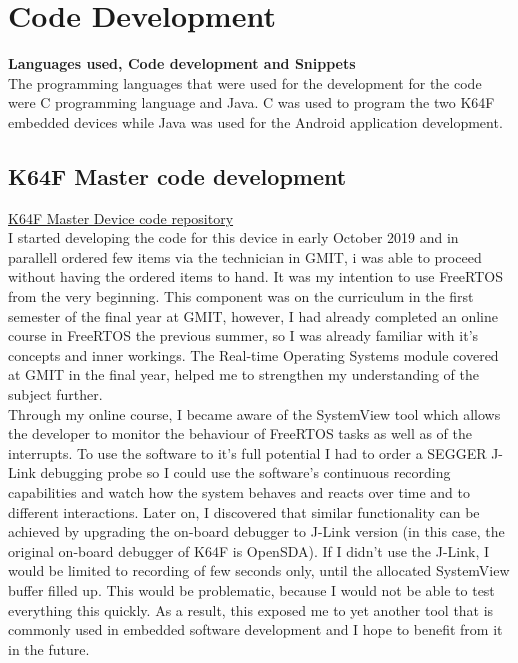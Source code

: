 \documentclass[12pt,a4paper]{article}
\begin{document}
            \newpage
		
		\section{Code Development}
		{\bfseries Languages used, Code development and Snippets}\\
		
		The programming languages that were used for the development for the code were C programming language and Java. C was used to program the two K64F embedded devices while Java was used for the Android application development.
		
		\subsection{K64F Master code development}
		\href{https://github.com/zedd-1983/project_journal/tree/bt2}{K64F Master Device code repository}\\
		
		I started developing the code for this device in early October 2019 and in parallell ordered few items via the technician in GMIT, i was able to proceed without having the ordered items to hand.  It was my intention to use FreeRTOS from the very beginning. This component was on the curriculum in the first semester of the final year at GMIT, however, I had already completed an online course in FreeRTOS the previous summer, so I was already familiar with it's concepts and inner workings. The Real-time Operating Systems module covered at GMIT in the final year, helped me to strengthen my understanding of the subject further.\\
		
		Through my online course, I became aware of the SystemView tool which allows the developer to monitor the behaviour of FreeRTOS tasks as well as of the interrupts. To use the software to it's full potential I had to order a SEGGER J-Link debugging probe so I could use the software's continuous recording capabilities and watch how the system behaves and reacts over time and to different interactions. Later on, I discovered that similar functionality can be achieved by upgrading the on-board debugger to J-Link version (in this case, the original on-board debugger of K64F is OpenSDA). If I didn't use the J-Link, I would be limited to recording of few seconds only, until the allocated SystemView buffer filled up. This would be problematic, because I would not be able to test everything this quickly. As a result, this exposed me to yet another tool that is commonly used in embedded software development and I hope to benefit from it in the future.\\
		
\end{document}
